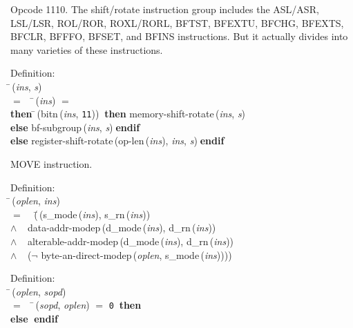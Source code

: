  Opcode 1110.
 The shift/rotate instruction group includes the ASL/ASR, LSL/LSR, ROL/ROR,
 ROXL/RORL, BFTST, BFEXTU, BFCHG, BFEXTS, BFCLR, BFFFO, BFSET, and BFINS
 instructions.  But it actually divides into many varieties of these
 instructions.
\begin{tabbing}{\sc Definition}: \\  
\=\,({\it{ins\/}}, {\it{s\/}}) \\ 
$=$$\;\;\;\;$\=\,({\it{ins\/}}) $=$ {} \\ 
{\bf then }\=\,({\rm{bitn}}\,({\it{ins\/}}, {\tt{11}}))$\;\;${\bf then }{\rm{memory-shift-rotate}}\,({\it{ins\/}}, {\it{s\/}}) \\ 
{\bf else }{\rm{bf-subgroup}}\,({\it{ins\/}}, {\it{s\/}})$\;${\bf  endif}\- \\ 
{\bf else }{\rm{register-shift-rotate}}\,({\rm{op-len}}\,({\it{ins\/}}), {\it{ins\/}}, {\it{s\/}})$\;${\bf  endif}\-\-
\end{tabbing}

 MOVE instruction.
\begin{tabbing}{\sc Definition}: \\  
\=\,({\it{oplen\/}}, {\it{ins\/}}) \\ 
$=$$\;\;\;\;$(\=\,({\rm{s\_mode}}\,({\it{ins\/}}), {\rm{s\_rn}}\,({\it{ins\/}})) \\ 
$\wedge$$\;\;\;\;${\rm{data-addr-modep}}\,({\rm{d\_mode}}\,({\it{ins\/}}), {\rm{d\_rn}}\,({\it{ins\/}})) \\ 
$\wedge$$\;\;\;\;${\rm{alterable-addr-modep}}\,({\rm{d\_mode}}\,({\it{ins\/}}), {\rm{d\_rn}}\,({\it{ins\/}})) \\ 
$\wedge$$\;\;\;\;$($\neg$ {\rm{byte-an-direct-modep}}\,({\it{oplen\/}}, {\rm{s\_mode}}\,({\it{ins\/}}))))\-\-
\end{tabbing}

\begin{tabbing}{\sc Definition}: \\  
\=\,({\it{oplen\/}}, {\it{sopd\/}}) \\ 
$=$$\;\;\;\;$\=\,({\it{sopd\/}}, {\it{oplen\/}}) $=$ {\tt{0}}$\;\;${\bf then }{} \\ 
{\bf else }{}$\;${\bf  endif}\-\-
\end{tabbing}

